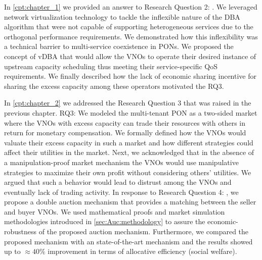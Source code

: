 In \autoref{cpt:chapter_1} we provided an answer to Research Question 2: \textit{\RQb}. We leveraged network virtualization technology to tackle the inflexible nature of the \ac{DBA} algorithm that were not capable of supporting heterogeneous services due to the orthogonal performance requirements. We demonstrated how this inflexibility was a technical barrier to multi-service coexistence in \acp{PON}. We proposed the concept of \ac{vDBA} that would allow the \acp{VNO} to operate their desired instance of upstream capacity scheduling thus meeting their service-specific \ac{QoS} requirements. We finally described how the lack of economic sharing incentive for sharing the excess capacity among these operators motivated the RQ3.


In \autoref{cpt:chapter_2} we addressed the Research Question 3 that was raised in the previous chapter. RQ3: \textit{\RQc} We modeled the multi-tenant \ac{PON} as a two-sided market where the \acp{VNO} with excess capacity can trade their resources with others in return for monetary compensation. We formally defined how the \acp{VNO} would valuate their excess capacity in such a market and how different strategies could affect their utilities in the market. Next, we acknowledged that in the absence of a manipulation-proof market mechanism the \acp{VNO} would use manipulative strategies to maximize their own profit without considering others' utilities. We argued that such a behavior would lead to distrust among the \acp{VNO} and eventually lack of trading activity. In response to Research Question 4: \textit{\RQd}, we propose a double auction mechanism that provides a matching between the seller and buyer \acp{VNO}. We used mathematical proofs and market simulation methodologies introduced in \autoref{sec:Auc:methodology} to assure the economic-robustness of the proposed auction mechanism. Furthermore, we compared the proposed mechanism with an state-of-the-art mechanism and the results showed up to $\approx 40\%$ improvement in terms of allocative efficiency (social welfare). 

